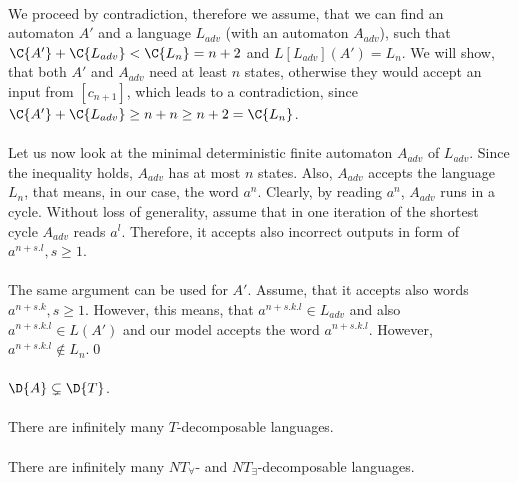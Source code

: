 \paragraph{}
We proceed by contradiction, therefore we assume, that we can find an automaton $A'$ and a language $L_{adv}$ (with an automaton $A_{adv}$), such that $\C{A'} + \C{L_{adv}} < \C{L_n} = n+2$ and $L[L_{adv}](A') = L_n$. We will show, that both $A'$ and $A_{adv}$ need at least $n$ states, otherwise they would accept an input from $[c_{n+1}]$, which leads to a contradiction, since $\C{A'} + \C{L_{adv}} \geq n+n \geq n+2 = \C{L_n}$.

\paragraph{}
Let us now look at the minimal deterministic finite  automaton $A_{adv}$ of $L_{adv}$. Since the inequality holds, $A_{adv}$ has at most $n$ states. Also, $A_{adv}$ accepts the language $L_n$, that means, in our case, the word $a^n$. Clearly, by reading $a^n$, $A_{adv}$ runs in a cycle. Without loss of generality, assume that in one iteration of the shortest cycle $A_{adv}$ reads $a^l$. Therefore, it accepts also incorrect outputs in form of $a^{n + s.l}, s \geq 1$.

\paragraph{}
The same argument can be used for $A'$. Assume, that it accepts also words $a^{n + s.k}, s \geq 1$. However, this means, that $a^{n+s.k.l} \in L_{adv}$ and also $a^{n+s.k.l} \in L(A')$ and our model accepts the word $a^{n + s.k.l}$. However, $a^{n + s.k.l} \notin L_n$.\qed

\paragraph{}
\cdosledok $\D{A} \subsetneq \D{T}$.

\paragraph{}
\cdosledok There are infinitely many $T$-decomposable languages.

\paragraph{}
\cdosledok There are infinitely many $NT_{\forall}$- and $NT_{\exists}$-decomposable languages.

